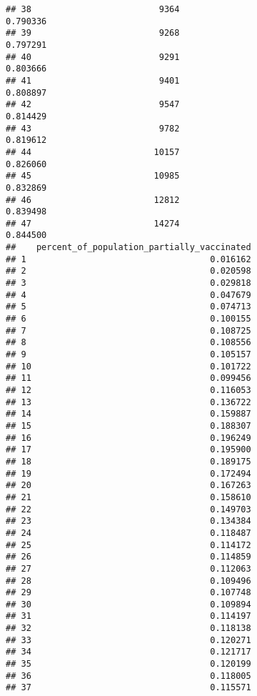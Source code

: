 \documentclass[
]{article}
\begin{document}
\begin{verbatim}
## 38                         9364                               0.790336
## 39                         9268                               0.797291
## 40                         9291                               0.803666
## 41                         9401                               0.808897
## 42                         9547                               0.814429
## 43                         9782                               0.819612
## 44                        10157                               0.826060
## 45                        10985                               0.832869
## 46                        12812                               0.839498
## 47                        14274                               0.844500
##    percent_of_population_partially_vaccinated
## 1                                    0.016162
## 2                                    0.020598
## 3                                    0.029818
## 4                                    0.047679
## 5                                    0.074713
## 6                                    0.100155
## 7                                    0.108725
## 8                                    0.108556
## 9                                    0.105157
## 10                                   0.101722
## 11                                   0.099456
## 12                                   0.116053
## 13                                   0.136722
## 14                                   0.159887
## 15                                   0.188307
## 16                                   0.196249
## 17                                   0.195900
## 18                                   0.189175
## 19                                   0.172494
## 20                                   0.167263
## 21                                   0.158610
## 22                                   0.149703
## 23                                   0.134384
## 24                                   0.118487
## 25                                   0.114172
## 26                                   0.114859
## 27                                   0.112063
## 28                                   0.109496
## 29                                   0.107748
## 30                                   0.109894
## 31                                   0.114197
## 32                                   0.118138
## 33                                   0.120271
## 34                                   0.121717
## 35                                   0.120199
## 36                                   0.118005
## 37                                   0.115571

\end{verbatim}
\end{document}
